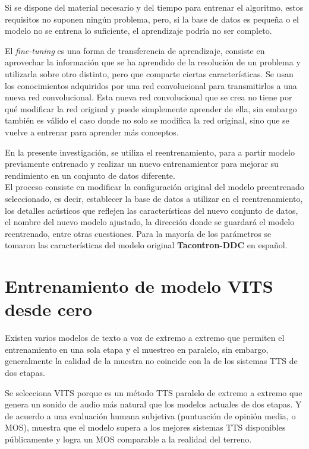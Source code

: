 Si se dispone del material necesario y del tiempo para entrenar el algoritmo, estos requisitos no suponen ningún problema, pero, si la base de datos es pequeña o el modelo no se entrena lo suficiente, el aprendizaje podría no ser completo.

El \textit{fine-tuning} es una forma de transferencia de aprendizaje, consiste en aprovechar la información que se ha aprendido de
la resolución de un problema y utilizarla sobre otro distinto, pero que comparte ciertas características. Se usan los conocimientos adquiridos por una red convolucional para transmitirlos a una nueva red convolucional. Esta nueva red convolucional que se crea no tiene por qué modificar la red original y puede simplemente aprender de ella, sin embargo también es válido el caso donde no solo se modifica la red original, sino que se vuelve a entrenar para aprender más conceptos.
  
En la presente investigación, se utiliza el reentrenamiento, para a partir modelo previamente entrenado y realizar un nuevo entrenamientor para mejorar su rendimiento en un conjunto de datos diferente.\\

El proceso consiste en modificar la configuración original del modelo preentrenado seleccionado, es decir, establecer la base de datos a utilizar en el reentrenamiento, los detalles acústicos que reflejen las características del nuevo conjunto de datos, el nombre del nuevo modelo ajustado, la dirección donde se guardará el modelo reentrenado, entre otras cuestiones. Para la mayoría de los parámetros se tomaron las características del modelo original \textbf{Tacontron-DDC} en español.



\section{Entrenamiento de modelo VITS desde cero}

Existen varios modelos de texto a voz de extremo a extremo que permiten el entrenamiento en una sola etapa y el muestreo en paralelo, sin embargo, generalmente la calidad de la muestra no coincide con la de los sistemas TTS de dos etapas. 

Se selecciona VITS porque es un método TTS paralelo de extremo a extremo que genera un sonido de audio más natural que los modelos actuales de dos etapas. Y de acuerdo a una evaluación humana subjetiva (puntuación de opinión media, o MOS), muestra que el modelo supera a los mejores sistemas TTS disponibles públicamente y logra un MOS comparable a la realidad del terreno.


	
	







